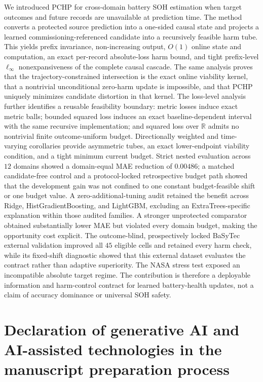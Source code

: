 \documentclass[11pt]{article}
\newcommand{\R}{\mathbb{R}}
\begin{document}
We introduced PCHP for cross-domain battery SOH estimation when target outcomes and future records are unavailable at prediction time. The method converts a protected source prediction into a one-sided causal state and projects a learned commissioning-referenced candidate into a recursively feasible harm tube. This yields prefix invariance, non-increasing output, $O(1)$ online state and computation, an exact per-record absolute-loss harm bound, and tight prefix-level $\ell_\infty$ nonexpansiveness of the complete causal cascade. The same analysis proves that the trajectory-constrained intersection is the exact online viability kernel, that a nontrivial unconditional zero-harm update is impossible, and that PCHP uniquely minimizes candidate distortion in that kernel. The loss-level analysis further identifies a reusable feasibility boundary: metric losses induce exact metric balls; bounded squared loss induces an exact baseline-dependent interval with the same recursive implementation; and squared loss over $\R$ admits no nontrivial finite outcome-uniform budget. Directionally weighted and time-varying corollaries provide asymmetric tubes, an exact lower-endpoint viability condition, and a tight minimum current budget. Strict nested evaluation across $12$ domains showed a domain-equal MAE reduction of $0.00486$; a matched candidate-free control and a protocol-locked retrospective budget path showed that the development gain was not confined to one constant budget-feasible shift or one budget value. A zero-additional-tuning audit retained the benefit across Ridge, HistGradientBoosting, and LightGBM, excluding an ExtraTrees-specific explanation within those audited families. A stronger unprotected comparator obtained substantially lower MAE but violated every domain budget, making the opportunity cost explicit. The outcome-blind, prospectively locked BaSyTec external validation improved all $45$ eligible cells and retained every harm check, while its fixed-shift diagnostic showed that this external dataset evaluates the contract rather than adaptive superiority. The NASA stress test exposed an incompatible absolute target regime. The contribution is therefore a deployable information and harm-control contract for learned battery-health updates, not a claim of accuracy dominance or universal SOH safety.

\section*{Declaration of generative AI and AI-assisted technologies in the manuscript preparation process}
\end{document}
